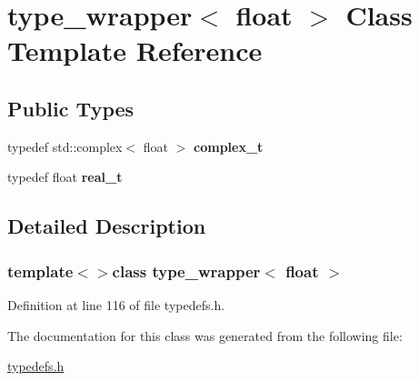 \hypertarget{classtype__wrapper_3_01float_01_4}{}\section{type\+\_\+wrapper$<$ float $>$ Class Template Reference}
\label{classtype__wrapper_3_01float_01_4}
\subsection*{Public Types}
\begin{DoxyCompactItemize}
\item 
\hypertarget{classtype__wrapper_3_01float_01_4_a2e20446a2223ab66a38fae16e0994d2e}{}typedef std\+::complex$<$ float $>$ {\bfseries complex\+\_\+t}\label{classtype__wrapper_3_01float_01_4_a2e20446a2223ab66a38fae16e0994d2e}

\item 
\hypertarget{classtype__wrapper_3_01float_01_4_a7277c679e081d2c33eef003f7eaaf900}{}typedef float {\bfseries real\+\_\+t}\label{classtype__wrapper_3_01float_01_4_a7277c679e081d2c33eef003f7eaaf900}

\end{DoxyCompactItemize}


\subsection{Detailed Description}
\subsubsection*{template$<$$>$class type\+\_\+wrapper$<$ float $>$}



Definition at line 116 of file typedefs.\+h.



The documentation for this class was generated from the following file\+:\begin{DoxyCompactItemize}
\item 
\hyperlink{typedefs_8h}{typedefs.\+h}\end{DoxyCompactItemize}
